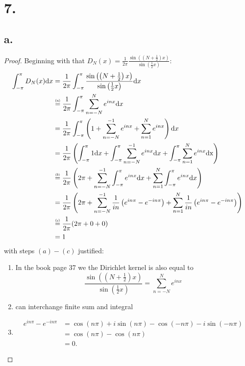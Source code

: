 \documentclass{article}
\newcommand\numeq[1]%
  {\stackrel{\scriptscriptstyle(\mkern-1.5mu#1\mkern-1.5mu)}{=}}
\begin{document}
\section*{7.}
\subsection*{a.}
\begin{proof}
  Beginning with that $D_N(x) = \frac{1}{2 \pi}\frac{\sin\left(\left(N + \frac{1}{2}\right)x\right)}{\sin\left(\frac{1}{2}x\right)}$:
  \begin{align*}
    \int_{-\pi}^{\pi}D_N(x) \mathrm{d}x &= \frac{1}{2 \pi}\int_{-\pi}^{\pi}\frac{\sin\left(\left(N + \frac{1}{2}\right)x\right)}{\sin\left(\frac{1}{2}x \right)}\mathrm{d}x \\
    &\numeq{a}\frac{1}{2 \pi}\int_{-\pi}^{\pi}\sum\limits_{n = -N}^Ne^{inx}\mathrm{d}x \\
    &= \frac{1}{2 \pi }\int_{-\pi}^{\pi}\left(1 + \sum\limits_{n = -N}^{-1}e^{inx} + \sum\limits_{n = 1}^Ne^{inx} \right)\mathrm{d}x \\
    &= \frac{1}{2 \pi }\left(\int_{-\pi}^{\pi} 1\mathrm{d}x + \int_{-\pi}^{\pi}\sum\limits_{n = -N}^{-1}e^{inx} \mathrm{d}x + \int_{-\pi}^{\pi} \sum\limits_{n = 1}^Ne^{inx} \mathrm{dx} \right) \\
    &\numeq{b} \frac{1}{2 \pi}\left(2 \pi + \sum\limits_{n = -N}^{-1}\int_{-\pi}^{\pi}e^{inx}\mathrm{d}x + \sum\limits_{n = 1}^N\int_{-\pi}^{\pi}e^{inx}\mathrm{d}x \right) \\
    &= \frac{1}{2 \pi} \left(2 \pi + \sum\limits_{n = -N}^{-1}\frac{1}{in}\left(e^{in \pi} - e^{-in \pi} \right) + \sum\limits_{n = 1}^N\frac{1}{in}\left(e^{in \pi} - e^{-in\pi} \right)\right) \\
    &\numeq{c} \frac{1}{2 \pi}(2 \pi + 0 + 0) \\
    &= 1
  \end{align*}
  with steps $(a)-(c)$ justified:
  \begin{enumerate}[\indent(a)]
   \item In the book page 37 we the Dirichlet kernel is also equal to \[
    \frac{\sin\left(\left(N + \frac{1}{2}\right)x\right)}{\sin\left(\frac{1}{2}x\right)} = \sum\limits_{n = -N}^Ne^{inx}
   \] 
    \item can interchange finite sum and integral 
    \item \begin{align*}
      e^{in \pi} - e^{-in\pi} &= \cos(n \pi) + i \sin(n \pi) - \cos(-n \pi) - i\sin(-n\pi)\\
      &= \cos(n \pi) - \cos(n \pi) \\
      &= 0.
    \end{align*}
  \end{enumerate}
\end{proof}
\end{document}
